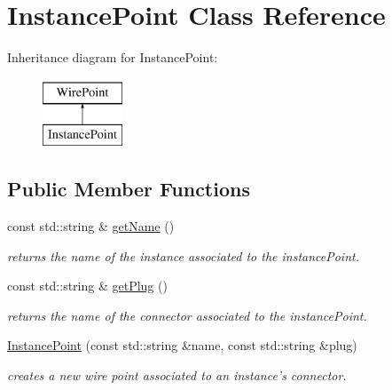 \hypertarget{class_open_chams_1_1_instance_point}{\section{Instance\-Point Class Reference}
\label{class_open_chams_1_1_instance_point}
}
Inheritance diagram for Instance\-Point\-:\begin{figure}[H]
\begin{center}
\leavevmode
\includegraphics[height=2.000000cm]{class_open_chams_1_1_instance_point}
\end{center}
\end{figure}
\subsection*{Public Member Functions}
\begin{DoxyCompactItemize}
\item 
\hypertarget{class_open_chams_1_1_instance_point_a2858c0c4e8b5108f041237cf5a802029}{const std\-::string \& \hyperlink{class_open_chams_1_1_instance_point_a2858c0c4e8b5108f041237cf5a802029}{get\-Name} ()}\label{class_open_chams_1_1_instance_point_a2858c0c4e8b5108f041237cf5a802029}

\begin{DoxyCompactList}\small\item\em returns the name of the instance associated to the instance\-Point. \end{DoxyCompactList}\item 
\hypertarget{class_open_chams_1_1_instance_point_a646d464666fc56ab2e04a6b87fdd3279}{const std\-::string \& \hyperlink{class_open_chams_1_1_instance_point_a646d464666fc56ab2e04a6b87fdd3279}{get\-Plug} ()}\label{class_open_chams_1_1_instance_point_a646d464666fc56ab2e04a6b87fdd3279}

\begin{DoxyCompactList}\small\item\em returns the name of the connector associated to the instance\-Point. \end{DoxyCompactList}\item 
\hyperlink{class_open_chams_1_1_instance_point_a1f3b6eda5ef7bb872c96f006021a61f1}{Instance\-Point} (const std\-::string \&name, const std\-::string \&plug)
\begin{DoxyCompactList}\small\item\em creates a new wire point associated to an instance's connector. \end{DoxyCompactList}\end{DoxyCompactItemize}



